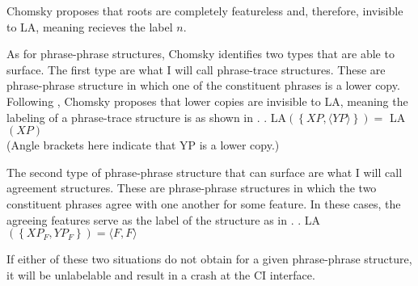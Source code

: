 \documentclass[MilwayThesis]{subfiles}
\begin{document}
Chomsky proposes that roots are completely featureless and, therefore, invisible to LA, meaning \Last[a] recieves the label $n$.

As for phrase-phrase structures, Chomsky identifies two types that are able to surface.
The first type are what I will call phrase-trace structures.
These are phrase-phrase structure in which one of the constituent phrases is a lower copy.
Following \textcite{moro2000dynamic}, Chomsky proposes that lower copies are invisible to LA, meaning the labeling of a phrase-trace structure is as shown in \Next.
\ex. LA$(\left\{ XP, \langle YP\rangle \right\}) =$ LA$(XP)$\\
(Angle brackets here indicate that YP is a lower copy.)

The second type of phrase-phrase structure that can surface are what I will call agreement structures.
These are phrase-phrase structures in which the two constituent phrases agree with one another for some feature.
In these cases, the agreeing features serve as the label of the structure as in \Next.
\ex. LA$(\left\{ XP_F, YP_F \right\}) = \langle F,F\rangle$

If either of these two situations do not obtain for a given phrase-phrase structure, it will be unlabelable and result in a crash at the CI interface.
\end{document}
